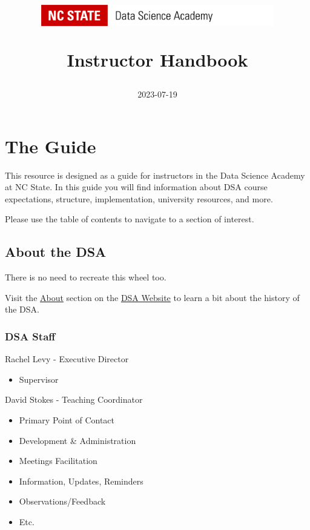 \documentclass[
]{book}
\title{\includegraphics[width=4in,height=\textheight]{DSA Logo.png}

Instructor Handbook}
\author{2023-07-19}
\date{}
\providecommand{\tightlist}{%
  \setlength{\itemsep}{0pt}\setlength{\parskip}{0pt}}
\begin{document}
\maketitle

{
\setcounter{tocdepth}{1}
\tableofcontents
}
\hypertarget{the-guide}{%
\chapter{The Guide}\label{the-guide}}

This resource is designed as a guide for instructors in the Data Science Academy at NC State. In this guide you will find information about DSA course expectations, structure, implementation, university resources, and more.

Please use the table of contents to navigate to a section of interest.

\hypertarget{about-the-dsa}{%
\section{About the DSA}\label{about-the-dsa}}

There is no need to recreate this wheel too.

Visit the \href{https://datascienceacademy.ncsu.edu/about/}{About} section on the \href{https://datascienceacademy.ncsu.edu/}{DSA Website} to learn a bit about the history of the DSA.

\hypertarget{dsa-staff}{%
\subsection{DSA Staff}\label{dsa-staff}}

Rachel Levy - Executive Director

\begin{itemize}
\tightlist
\item
  Supervisor
\end{itemize}

David Stokes - Teaching Coordinator

\begin{itemize}
\tightlist
\item
  Primary Point of Contact
\item
  Development \& Administration
\item
  Meetings Facilitation
\item
  Information, Updates, Reminders
\item
  Observations/Feedback
\item
  Etc.
\end{itemize}
\end{document}
